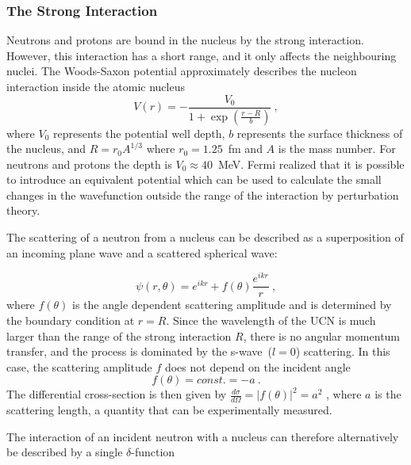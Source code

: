 \subsubsection{The Strong Interaction}
Neutrons and protons are bound in the nucleus by the strong
interaction. However, this interaction has a short range, and it only
affects the neighbouring nuclei. The Woods-Saxon potential
approximately describes the nucleon interaction inside the atomic
nucleus~\cite{WoodSaxon}
\begin{equation}
  \label{eqn:woodsax}
  V(r) = - \frac{V_0}{1+\exp(\frac{r-R}{b})}~,
\end{equation}
where $V_0$ represents the potential well depth, $b$ represents the
surface thickness of the nucleus, and $R = r_0 A^{1/3}$ where
$r_0 = 1.25$~fm and $A$ is the mass number. For neutrons and protons
the depth is $V_0 \approx 40$~MeV.
Fermi realized that it is possible to introduce an equivalent
potential which can be used to calculate the small changes in the
wavefunction outside the range of the interaction by perturbation
theory.


The scattering of a neutron from a nucleus can be described as a
superposition of an incoming plane wave and a scattered spherical
wave:

\begin{equation}
  \psi(r, \theta) = e^{ikr} + f(\theta)\frac{e^{ikr}}{r}~,
\end{equation}
where $f(\theta)$ is the angle dependent scattering amplitude and is
determined by the boundary condition at $r = R$. Since the wavelength
of the UCN is much larger than the range of the strong interaction
$R$, there is no angular momentum transfer, and the process is
dominated by the s-wave~($l = 0$) scattering. In this case, the
scattering amplitude $f$ does not depend on the incident angle
\begin{equation}
f(\theta) = const. = -a~.
\end{equation}
The differential cross-section is then given by
$\frac{d\sigma}{d\Omega} = |f(\theta)|^2 = a^2$ , where $a$ is the
scattering length, a quantity that can be experimentally measured.

The interaction of an incident neutron with a nucleus can therefore
alternatively be described by a single
$\delta$-function~\cite{ucnbook}


